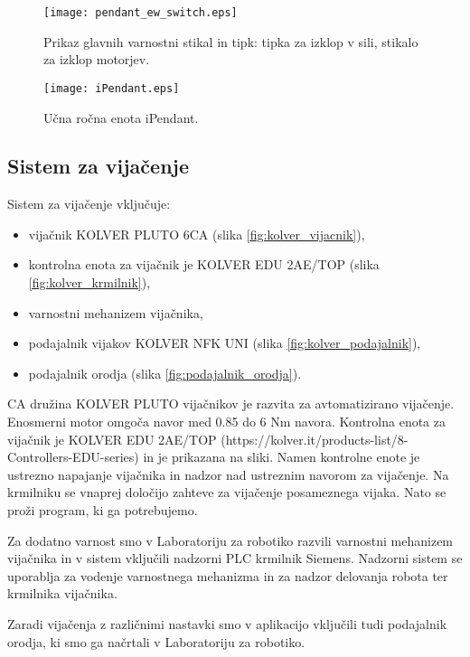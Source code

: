 \begin{figure}[!hbt]
	\centering
	\texttt{[image: pendant\_ew\_switch.eps]}
	\caption{Prikaz glavnih varnostni stikal in tipk: tipka za izklop v sili, stikalo za izklop motorjev.}
	\label{fig:pendant_ew_switch}
\end{figure}

\begin{figure}[H]
	\centering
	\texttt{[image: iPendant.eps]}
	\caption{Učna ročna enota iPendant.}
	\label{fig:iPendant}
\end{figure}

\newpage

\subsection{Sistem za vijačenje}

Sistem za vijačenje vključuje:
\begin{itemize}
	\item vijačnik KOLVER PLUTO 6CA (slika \ref{fig:kolver_vijacnik}),
	\item kontrolna enota za vijačnik je KOLVER EDU 2AE/TOP (slika \ref{fig:kolver_krmilnik}),
	\item varnostni mehanizem vijačnika,
	\item podajalnik vijakov KOLVER NFK UNI (slika \ref{fig:kolver_podajalnik}),
	\item podajalnik orodja (slika \ref{fig:podajalnik_orodja}).
\end{itemize}

CA družina KOLVER PLUTO vijačnikov je razvita za avtomatizirano vijačenje. Enosmerni motor omgoča navor med 0.85 do 6 Nm navora. Kontrolna enota za vijačnik je KOLVER EDU 2AE/TOP (https://kolver.it/products-list/8-Controllers-EDU-series) in je prikazana na sliki. Namen kontrolne enote je ustrezno napajanje vijačnika in nadzor nad ustreznim navorom za vijačenje. Na krmilniku se vnaprej določijo zahteve za vijačenje posameznega vijaka. Nato se proži program, ki ga potrebujemo. 

Za dodatno varnost smo v Laboratoriju za robotiko razvili varnostni mehanizem vijačnika in v sistem vključili nadzorni PLC krmilnik Siemens. Nadzorni sistem se uporablja za vodenje varnostnega mehanizma in za nadzor delovanja robota ter krmilnika vijačnika.

Zaradi vijačenja z različnimi nastavki smo v aplikacijo vključili tudi podajalnik orodja, ki smo ga načrtali v Laboratoriju za robotiko.

